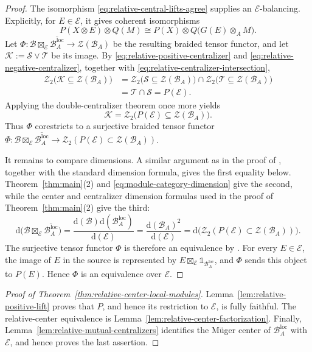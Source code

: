 \documentclass[10pt,a4paper]{amsart}
\numberwithin{equation}{section}
\newcommand{\unit}{\mathds{1}}
\newcommand{\B}{\mathcal{B}}
\newcommand{\E}{\mathcal{E}}
\newcommand{\Z}{\mathcal{Z}}
\newcommand{\T}{\mathcal{T}}
\newcommand{\cS}{\mathcal{S}}
\newcommand{\loc}{\mathrm{loc}}
\newcommand{\FP}{\mathrm{d}}
\begin{document}
\begin{proof}
The isomorphism \eqref{eq:relative-central-lifts-agree} supplies an
$\E$-balancing. Explicitly, for $E\in\E$, it gives coherent isomorphisms
\[
  P(X\otimes E)\otimes Q(M)
  \cong
  P(X)\otimes Q\bigl(G(E)\otimes_A M\bigr).
\]
Let $\Phi:\B\boxtimes_{\E}\overline{\B_A^\loc}\to\Z(\B_A)$ be the resulting braided
tensor functor, and let $\mathcal K:=\cS\vee\T$ be its image. By
\eqref{eq:relative-positive-centralizer} and
\eqref{eq:relative-negative-centralizer}, together with
\eqref{eq:relative-centralizer-intersection},
\[
\begin{aligned}
  \Z_2\bigl(\mathcal K\subseteq\Z(\B_A)\bigr)
  &=
  \Z_2\bigl(\cS\subseteq\Z(\B_A)\bigr)
  \cap
  \Z_2\bigl(\T\subseteq\Z(\B_A)\bigr)
  \\
  &=
  \T\cap\cS
  =
  P(\E).
\end{aligned}
\]
Applying the double-centralizer theorem once more yields
\[
  \mathcal K
  =
  \Z_2\bigl(P(\E)\subseteq\Z(\B_A)\bigr).
\]
Thus $\Phi$ corestricts to a surjective braided tensor functor $\Phi: \B\boxtimes_{\E}\overline{\B_A^\loc} \longrightarrow \Z_2(P(\E) \subset \Z(\B_A))$.

It remains to compare dimensions. A similar argument as in the proof of 
\cite[Theorem~3.2.1]{decoppet2025invertibility}, together with the
standard dimension formula, gives the first equality below.
Theorem~\ref{thm:main}(2) and \eqref{eq:module-category-dimension} give the
second, while the center and centralizer dimension formulas used in the proof
of Theorem~\ref{thm:main}(2) give the third:
\[
  \FP\bigl(\B\boxtimes_{\E}\overline{\B_A^\loc}\bigr)
  =\frac{\FP(\B)\FP(\B_A^\loc)}{\FP(\E)}
  =\frac{\FP(\B_A)^2}{\FP(\E)}
  =\FP\bigl(\Z_2(P(\E)\subset \Z(\B_A))\bigr).
\]
The surjective tensor functor $\Phi$ is therefore an equivalence by
\cite[Proposition~6.3.4]{etingof2016tensor}. For every $E\in\E$, the image of $E$ in the source is represented by $E\boxtimes_{\E}\unit_{\B_A^\loc}$, and $\Phi$ sends this object to
$P(E)$. Hence $\Phi$ is an equivalence over $\E$.
\end{proof}


\begin{proof}[Proof of Theorem~\ref{thm:relative-center-local-modules}]
Lemma~\ref{lem:relative-positive-lift} proves that $P$, and hence its
restriction to $\E$, is fully faithful. The relative-center equivalence is
Lemma~\ref{lem:relative-center-factorization}. Finally,
Lemma~\ref{lem:relative-mutual-centralizers} identifies the M\"uger center of
$\B_A^{\loc}$ with $\E$, and hence proves the last assertion.
\end{proof}
\end{document}
